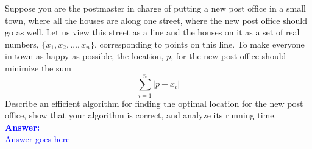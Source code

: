 \item{}
Suppose you are the postmaster in charge of putting a new post office in a small
town, where all the houses are along one street, where the new post office
should go as well. Let us view this street as a line and the houses on it as a
set of real numbers, $\lbrace x_1,x_2,\ldots,x_n\rbrace$, corresponding to
points on this line. To make everyone in town as happy as possible, the
location, $p$, for the new post office should minimize the sum
$$\sum_{i=1}^n|p-x_i|$$
Describe an efficient algorithm for finding the optimal location for the new
post office, show that your algorithm is correct, and analyze its running time.
\\[12pt]
\ifanswers
\textcolor{blue}{
\textbf{Answer:}\\[6pt]
Answer goes here
}
\newpage
\fi

